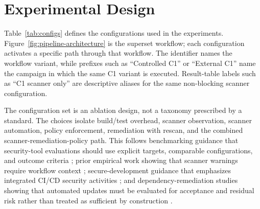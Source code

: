 \section{Experimental Design}

Table~\ref{tab:configs} defines the configurations used in the experiments. Figure~\ref{fig:pipeline-architecture} is the superset workflow; each configuration activates a specific path through that workflow. The identifier names the workflow variant, while prefixes such as ``Controlled C1'' or ``External C1'' name the campaign in which the same C1 variant is executed. Result-table labels such as ``C1 scanner only'' are descriptive aliases for the same non-blocking scanner configuration.

The configuration set is an ablation design, not a taxonomy prescribed by a standard. The choices isolate build/test overhead, scanner observation, scanner automation, policy enforcement, remediation with rescan, and the combined scanner-remediation-policy path. This follows benchmarking guidance that security-tool evaluations should use explicit targets, comparable configurations, and outcome criteria \cite{pariziBenchmark2018}; prior empirical work showing that scanner warnings require workflow context \cite{johnsonStaticAnalysis2013,bellerStaticAnalysis2016}; secure-development guidance that emphasizes integrated CI/CD security activities \cite{nistSP800204D,nistSSDF,owaspSAMM}; and dependency-remediation studies showing that automated updates must be evaluated for acceptance and residual risk rather than treated as sufficient by construction \cite{decanNpm2018,mirhosseiniPullRequests2017}.


